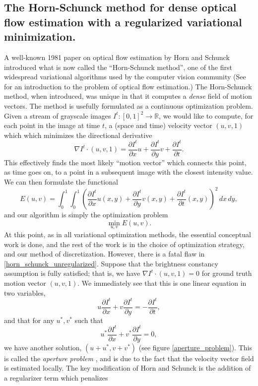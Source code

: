 \documentclass[conference]{IEEEtran}
\newcommand{\Part}[2]{\frac{\partial #1}{\partial #2}}
\begin{document}
\subsection{The Horn-Schunck method for dense optical flow estimation with a regularized variational minimization.}
A well-known 1981 paper on optical flow estimation by Horn and Schunck \cite{horn_schunck} introduced what is now called the ``Horn-Schunck method'', one of the
first widespread variational algorithms used by the computer vision community
(See \cite{szeliski} for an introduction to the problem of optical flow estimation.) The Horn-Schunck method, when introduced, was unique in that
it computes a \textit{dense} field of motion vectors. The method is usefully formulated as a continuous optimization problem.
Given a stream of grayscale images $I^t : [0,1]^2 \rightarrow \mathbb{R}$, we would like to compute, for each point in the image at time $t$, a (space and time) velocity vector $(u,v,1)$
which which minimizes the directional derivative
    $$\nabla I^t \cdot(u, v, 1) = \Part{I^t}{x} u + \Part{I^t}{y}v + \Part{I^t}{t}.$$
This effectively finds the most likely ``motion vector'' which connects this point, as time goes on, to a point
in a subsequent image with the closest intensity value.
We can then formulate the functional
\begin{equation}
    E(u, v) = \int_0^1\int_0^1\left(\Part{I^t}{x} u(x,y) + \Part{I^t}{y}v(x,y) + \Part{I^t}{t}(x,y)\right)^2 \,dx\,dy,
\end{equation}
and our algorithm is simply the optimization problem
\begin{equation}\label{horn_schunck_unregularized}
    \min_{u,v}E(u, v).
\end{equation}
At this point, as in all variational optimization methods,
the essential conceptual work is done, and the rest of the work is in the choice of optimization strategy,
and our method of discretization. However, there is a fatal flaw in \eqref{horn_schunck_unregularized}.
Suppose that the brightness constancy assumption is fully satisfied; that is, we have $\nabla I^t \cdot (u, v, 1) = 0$
for ground truth motion vector $(u,v,1)$. We immediately see that this is one linear equation in two variables,
    $$u\Part{I^t}{x} + v\Part{I^t}{y} = -\Part{I^t}{t},$$
and that for any $u^*,v^*$ such that
    $$u^*\Part{I^t}{x} + v^*\Part{I^t}{y} = 0,$$
we have another solution, $(u + u^*, v + v^*)$ (see figure \ref{aperture_problem}). This is called the \textit{aperture problem} \cite{aperture_problem}, and is due to
the fact that the velocity vector field is estimated locally. The key modification of Horn and Schunck is the addition of a regularizer term which penalizes
\end{document}
